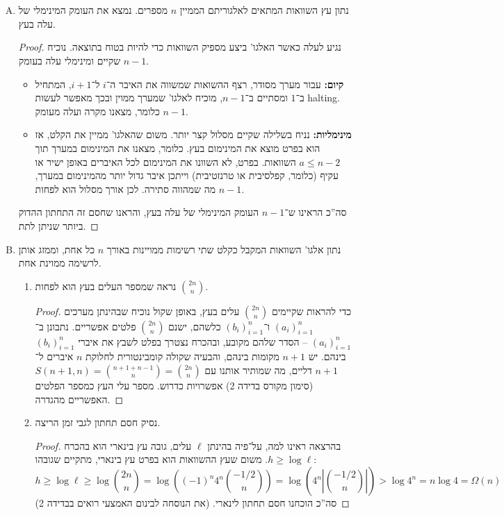 \documentclass[]{article}
\newcommand\ml    {\ell}
\newcommand\sof[1]    {\left | #1 \right |}
\newcommand\cl [1]    {\left ( #1 \right )}
\theoremstyle{definition}
\begin{document}
	\section{}
	\begin{enumerate}[A.]
		\item נתון עץ השוואות המתאים לאלגוריתם הממיין $n$ מספרים. נמצא את העומק המינימלי של עלה בעץ. \begin{proof}
			נגיע לעלה כאשר האלגו' ביצע מספיק השוואות כדי להיות בטוח בתוצאה. נוכיח שקיים ומינימלי עלה בעומק $n - 1$. 
			\begin{itemize}
				\item \textbf{קיום: }עבור מערך מסודר, רצף ההשואות שמשווה את האיבר ה־$i$ ל־$i + 1$, המתחיל ב־$1$ ומסתיים ב־$n - 1$, מוכיח לאלגו' שמערך ממוין ובכך מאפשר לעשות halting. כלומר, מצאנו מקרה ועלה מעומק $n - 1$. 
				\item \textbf{מינימליות: }נניח בשלילה שקיים מסלול קצר יותר. משום שהאלגו' ממיין את הקלט, אז הוא בפרט מוצא את המינימום בעץ. כלומר, מצאנו את המינימום במערך תוך $a \le n - 2$ השוואות. בפרט, לא השוונו את המינימום לכל האיברים באופן ישיר או עקיף (כלומר, קפלסיבית או טרנזטיבית) וייתכן איבר גדול יותר מהמינימום במערך, מה שמהווה סתירה. לכן אורך מסלול הוא לפחות $n - 1$. 
			\end{itemize}
			סה''כ הראינו ש־$n - 1$ העומק המינימלי של עלה בעץ, והראנו שחסם זה התחתון ההדוק ביותר שניתן לתת. 
		\end{proof}
		\item נתון אלגו' השוואות המקבל כקלט שתי רשימות ממויינות באורך $n$ כל אחת, וממזג אותן לרשימה ממוינת אחת. 
		\begin{enumerate}[1.]
			\item נראה שמספר העלים בעץ הוא לפחות $\binom{2n}{n}$. \begin{proof}
				כדי להראות שקיימים $\binom{2n}{n}$ עלים בעץ, באופן שקול נוכיח שבהינתן מערכים $(a_i)_{i = 1}^{n}$ ו־$(b_i)_{i = 1}^{n}$ כלשהם, ישנם $ \binom{2n}{n}$ פלטים אפשריים. נתבונן ב־$(a_i)_{i = 1}^{n}$ – הסדר שלהם מקובע, ובהכרח נצטרך בפלט לשבץ את איברי $(b_i)_{i = 1}^{n}$ בינהם. יש $n + 1$ מקומות בינהם, והבעיה שקולה קומבינטורית לחלוקת $n$ איברים ל־$n + 1$ דליים, מה שמותיר אותנו עם $S(n + 1, n) = \binom{n + 1 + n - 1}{n} = \binom{2n}{n}$ (סימון מקורס בדידה 2) אפשרויות כדרוש. מספר עלי העץ כמספר הפלטים האפשריים מהגדרה. 
				\end{proof}
			\item נסיק חסם תחתון לגבי זמן הריצה. \begin{proof}
				בהרצאה ראינו למה, על־פיה בהינתן $\ml$ עלים, גובה עץ בינארי הוא בהכרח $h \ge \log \ml$. משום שעץ ההשוואות הוא בפרט עץ בינארי, מתקיים שגובהו: 
				\[ h \ge \log \ml \ge \log \binom{2n}{n} = \log \cl{(-1)^{n}4^{n}\binom{-1/2}{n}} = \log\cl{4^{n}\sof{\binom{-1/2}{n}}} > \log 4^n = n \log 4 = \Omega(n)  \]
				סה''כ הוכחנו חסם תחתון לינארי. (את הנוסחה לבינום האמצעי רואים בבדידה 2)
			\end{proof}
		\end{enumerate}
	\end{enumerate}
	
\end{document}
